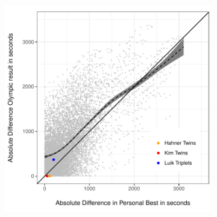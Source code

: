 \documentclass[12pt,titlepage]{article}
\begin{document}

\begin{figure}[!ht]
 \caption{Differences in personal best times and finishing times}
 \label{fig:diffdiffscatter}
 \centering
 \begin{subfigure}{.5\textwidth}
 \includegraphics[width=\textwidth, keepaspectratio]{diff_in_diff_scatter_plot.pdf}
 \end{subfigure}
\end{figure}
\end{document}
